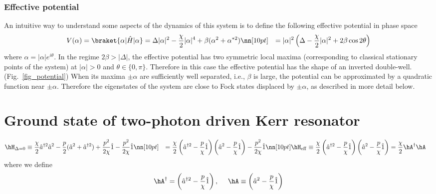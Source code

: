 \subsubsection{Effective potential}
An intuitive way to understand some aspects of the dynamics of this system is to define the following effective potential \cite{Zhang2017} in phase space
\begin{align}
V(\alpha) &= \braket{\alpha|\hat{H}|\alpha} = \Delta |\alpha|^2 - \frac{\chi}{2} |\alpha|^4 + \beta (\alpha^2 + \alpha^{* 2})\nn[10pt]
&= |\alpha|^2 \left( \Delta - \frac{\chi}{2} |\alpha|^2 + 2\beta \cos 2\theta \right)
\end{align}
where $\alpha = |\alpha | e^{i\theta}$. In the regime $2\beta > |\Delta|$, the effective potential has two symmetric local maxima (corresponding to classical stationary points of the system) at $|\alpha|>0$ and $\theta \in \{0,\pi\}$. Therefore in this case the effective potential has the shape of an inverted double-well. (Fig.~\ref{fig_potential}) When its maxima $\pm\alpha$ are sufficiently well separated, i.e., $\beta$ is large, the potential can be approximated by a quadratic function near $\pm\alpha$. Therefore the eigenstates of the system are close to Fock states displaced by $\pm\alpha$, as described in more detail below.







\section{Ground state of two-photon driven Kerr resonator}
\begin{align}
    \hH_{\Delta=0}&\equiv\frac{\chi}{2} \hat{a}^{\dagger2}\hat{a}^2 - \frac{p}{2} (\hat{a}^2 + \hat{a}^{\dagger 2})+\frac{p^2}{2\chi}\hat{1}-\frac{p^2}{2\chi}\hat{1}\nn[10pt]
    &=\frac{\chi}{2}\left(
    \hat{a}^{\dag 2}-\frac{p}{\chi}\hat{1}
    \right)
    \left(
    \hat{a}^{2}-\frac{p}{\chi}\hat{1}
    \right)-\frac{p^2}{2\chi}\hat{1}\nn[10pt]
    \hH_{\rm{eff}}&\equiv\frac{\chi}{2}\left(
    \hat{a}^{\dag 2}-\frac{p}{\chi}\hat{1}
    \right)
    \left(
    \hat{a}^{2}-\frac{p}{\chi}\hat{1}
    \right)
    =\frac{\chi}{2}\hA^\dag\hA
\end{align}
where we define
\begin{align}
    \hA^\dag=\left(
    \hat{a}^{\dag 2}-\frac{p}{\chi}\hat{1}
    \right),\ \ \ \ 
    \hA\equiv\left(
    \hat{a}^{2}-\frac{p}{\chi}\hat{1}
    \right)
\end{align}


